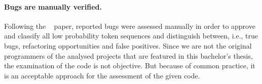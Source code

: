 \paragraph{Bugs are manually verified.}
Following the \bugram{}~\cite{bugram} paper, reported bugs were assessed manually in order to approve and classify all low probability token sequences and distinguish between, i.e., true bugs, refactoring opportunities and false positives. Since we are not the original programmers of the analysed projects that are featured in this bachelor's thesis, the examination of the code is not objective. But because of common practice, it is an acceptable approach for the assessment of the given code.